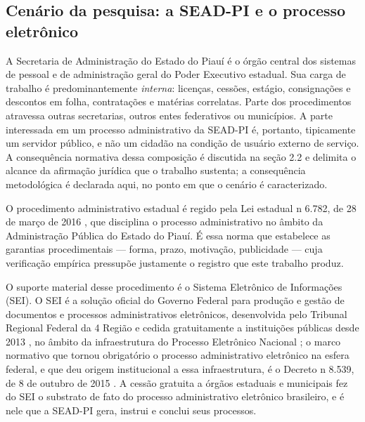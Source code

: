\subsection{Cenário da pesquisa: a SEAD-PI e o processo eletrônico}\label{sec:cenario}

A Secretaria de Administração do Estado do Piauí é o órgão central dos sistemas de pessoal e de
administração geral do Poder Executivo estadual. Sua carga de trabalho é predominantemente
\emph{interna}: licenças, cessões, estágio, consignações e descontos em folha, contratações e
matérias correlatas. Parte dos procedimentos atravessa outras secretarias, outros entes federativos
ou municípios. A parte interessada em um processo administrativo da SEAD-PI é, portanto, tipicamente
um servidor público, e não um cidadão na condição de usuário externo de serviço. A consequência
normativa dessa composição é discutida na seção 2.2 e delimita o alcance da afirmação jurídica que
o trabalho sustenta; a consequência metodológica é declarada aqui, no ponto em que o cenário é
caracterizado.

O procedimento administrativo estadual é regido pela Lei estadual n\textordmasculine{} 6.782, de 28
de março de 2016 \cite{state2016procedurelaw}, que disciplina o processo administrativo no âmbito
da Administração Pública do Estado do Piauí. É essa norma que estabelece as garantias
procedimentais --- forma, prazo, motivação, publicidade --- cuja verificação empírica pressupõe
justamente o registro que este trabalho produz.

O suporte material desse procedimento é o Sistema Eletrônico de Informações (SEI). O SEI é a
solução oficial do Governo Federal para produção e gestão de documentos e processos administrativos
eletrônicos, desenvolvida pelo Tribunal Regional Federal da 4\textordfeminine{} Região e cedida
gratuitamente a instituições públicas desde 2013 \cite{brasil2024sei}, no âmbito da infraestrutura
do Processo Eletrônico Nacional \cite{brasil2024pen}; o marco normativo que tornou obrigatório o
processo administrativo eletrônico na esfera federal, e que deu origem institucional a essa
infraestrutura, é o Decreto n\textordmasculine{} 8.539, de 8 de outubro de 2015
\cite{brasil2015decreto8539}. A cessão gratuita a órgãos estaduais e municipais fez do SEI o
substrato de fato do processo administrativo eletrônico brasileiro, e é nele que a SEAD-PI gera, instrui e conclui seus processos.

